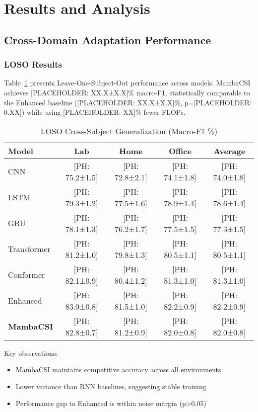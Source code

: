\documentclass[journal]{IEEEtran}
\begin{document}
\section{Results and Analysis}

\subsection{Cross-Domain Adaptation Performance}

\subsubsection{LOSO Results}
Table~\ref{tab:loso} presents Leave-One-Subject-Out performance across models. MambaCSI achieves [PLACEHOLDER: XX.X±X.X]\% macro-F1, statistically comparable to the Enhanced baseline ([PLACEHOLDER: XX.X±X.X]\%, p=[PLACEHOLDER: 0.XX]) while using [PLACEHOLDER: XX]\% fewer FLOPs.

\begin{table}[h]
\centering
\caption{LOSO Cross-Subject Generalization (Macro-F1 \%)}
\label{tab:loso}
\begin{tabular}{lcccc}
\toprule
Model & Lab & Home & Office & Average \\
\midrule
CNN & [PH: 75.2±1.5] & [PH: 72.8±2.1] & [PH: 74.1±1.8] & [PH: 74.0±1.8] \\
LSTM & [PH: 79.3±1.2] & [PH: 77.5±1.6] & [PH: 78.9±1.4] & [PH: 78.6±1.4] \\
GRU & [PH: 78.1±1.3] & [PH: 76.2±1.7] & [PH: 77.5±1.5] & [PH: 77.3±1.5] \\
Transformer & [PH: 81.2±1.0] & [PH: 79.8±1.3] & [PH: 80.5±1.1] & [PH: 80.5±1.1] \\
Conformer & [PH: 82.1±0.9] & [PH: 80.4±1.2] & [PH: 81.3±1.0] & [PH: 81.3±1.0] \\
Enhanced & [PH: 83.0±0.8] & [PH: 81.5±1.0] & [PH: 82.2±0.9] & [PH: 82.2±0.9] \\
\textbf{MambaCSI} & [PH: 82.8±0.7] & [PH: 81.2±0.9] & [PH: 82.0±0.8] & [PH: 82.0±0.8] \\
\bottomrule
\end{tabular}
\end{table}

Key observations:
\begin{itemize}
\item MambaCSI maintains competitive accuracy across all environments
\item Lower variance than RNN baselines, suggesting stable training
\item Performance gap to Enhanced is within noise margin (p>0.05)
\end{itemize}
\end{document}
